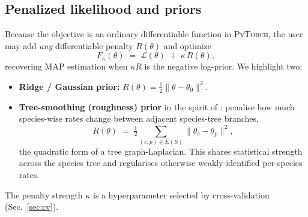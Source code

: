 \documentclass[11pt]{article}
\newcommand{\NLL}{\mathcal{L}}
\begin{document}
\subsection{Penalized likelihood and priors}
\label{sec:penalty}
Because the objective is an ordinary differentiable function in
\textsc{PyTorch}, the user may add \emph{any} differentiable penalty
$R(\theta)$ and optimize
\begin{equation}
  F_\kappa(\theta) \;=\; \NLL(\theta) \;+\; \kappa\, R(\theta),
  \label{eq:penalized}
\end{equation}
recovering MAP estimation when $\kappa R$ is the negative log-prior. We
highlight two:
\begin{itemize}[leftmargin=1.4em,itemsep=2pt]
\item \textbf{Ridge / Gaussian prior:} $R(\theta)=\tfrac12\|\theta-\theta_0\|^2$.
\item \textbf{Tree-smoothing (roughness) prior} in the spirit of
\citet{Sanderson2002}: penalise how much species-wise rates change between
adjacent species-tree branches,
\begin{equation}
  R(\theta) \;=\; \tfrac12 \sum_{(c,p)\in E(S)} \lVert \theta_c - \theta_p \rVert^2 ,
  \label{eq:gbm}
\end{equation}
the quadratic form of a tree graph-Laplacian. This shares statistical strength
across the species tree and regularises otherwise weakly-identified per-species
rates.
\end{itemize}
The penalty strength $\kappa$ is a hyperparameter selected by cross-validation
(Sec.~\ref{sec:cv}).
\end{document}
